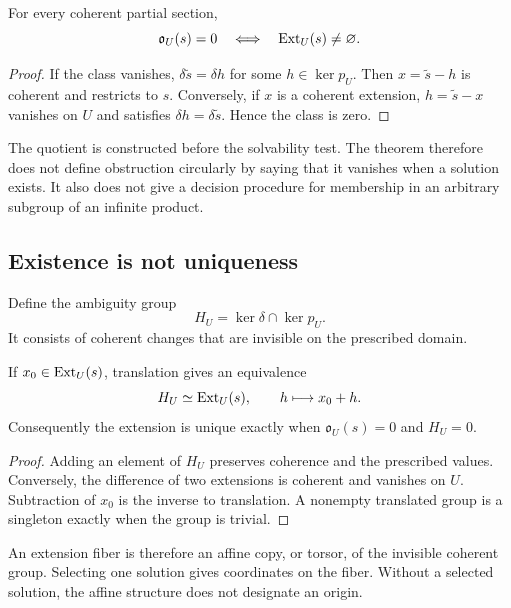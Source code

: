 \begin{theorem}\label{KS09}
For every coherent partial section,
\[
 \mathfrak o_U(s)=0\quad\Longleftrightarrow\quad\operatorname{Ext}_U(s)\ne\varnothing.
\]
\end{theorem}
\begin{proof}
If the class vanishes, \(\delta\widetilde s=\delta h\) for some \(h\in\ker p_U\). Then \(x=\widetilde s-h\) is coherent and restricts to \(s\). Conversely, if \(x\) is a coherent extension, \(h=\widetilde s-x\) vanishes on \(U\) and satisfies \(\delta h=\delta\widetilde s\). Hence the class is zero.
\end{proof}
The quotient is constructed before the solvability test. The theorem therefore does not define obstruction circularly by saying that it vanishes when a solution exists. It also does not give a decision procedure for membership in an arbitrary subgroup of an infinite product.


\subsection{Existence is not uniqueness}
Define the ambiguity group
\[
 H_U=\ker\delta\cap\ker p_U.
\]
It consists of coherent changes that are invisible on the prescribed domain.

\begin{theorem}\label{KS10}
If \(x_0\in\operatorname{Ext}_U(s)\), translation gives an equivalence
\[
 H_U\simeq\operatorname{Ext}_U(s),\qquad h\longmapsto x_0+h.
\]
Consequently the extension is unique exactly when \(\mathfrak o_U(s)=0\) and \(H_U=0\).
\end{theorem}
\begin{proof}
Adding an element of \(H_U\) preserves coherence and the prescribed values. Conversely, the difference of two extensions is coherent and vanishes on \(U\). Subtraction of \(x_0\) is the inverse to translation. A nonempty translated group is a singleton exactly when the group is trivial.
\end{proof}
An extension fiber is therefore an affine copy, or torsor, of the invisible coherent group. Selecting one solution gives coordinates on the fiber. Without a selected solution, the affine structure does not designate an origin.

